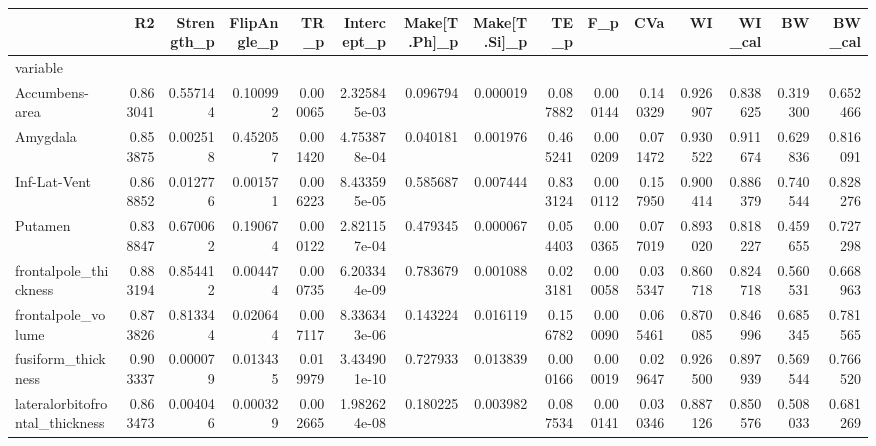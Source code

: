 \begin{tabular}{lrrrrrrrrrrrrrr}
\toprule
{} &        R2 &  Strength\_p &  FlipAngle\_p &      TR\_p &   Intercept\_p &  Make[T.Ph]\_p &  Make[T.Si]\_p &      TE\_p &       F\_p &       CVa &        WI &    WI\_cal &        BW &    BW\_cal \\
\midrule
variable                           &           &             &              &           &               &               &               &           &           &           &           &           &           &           \\
Accumbens-area                     &  0.863041 &    0.557144 &     0.100992 &  0.000065 &  2.325845e-03 &      0.096794 &      0.000019 &  0.087882 &  0.000144 &  0.140329 &  0.926907 &  0.838625 &  0.319300 &  0.652466 \\
Amygdala                           &  0.853875 &    0.002518 &     0.452057 &  0.001420 &  4.753878e-04 &      0.040181 &      0.001976 &  0.465241 &  0.000209 &  0.071472 &  0.930522 &  0.911674 &  0.629836 &  0.816091 \\
Inf-Lat-Vent                       &  0.868852 &    0.012776 &     0.001571 &  0.006223 &  8.433595e-05 &      0.585687 &      0.007444 &  0.833124 &  0.000112 &  0.157950 &  0.900414 &  0.886379 &  0.740544 &  0.828276 \\
Putamen                            &  0.838847 &    0.670062 &     0.190674 &  0.000122 &  2.821157e-04 &      0.479345 &      0.000067 &  0.054403 &  0.000365 &  0.077019 &  0.893020 &  0.818227 &  0.459655 &  0.727298 \\
frontalpole\_thickness              &  0.883194 &    0.854412 &     0.004474 &  0.000735 &  6.203344e-09 &      0.783679 &      0.001088 &  0.023181 &  0.000058 &  0.035347 &  0.860718 &  0.824718 &  0.560531 &  0.668963 \\
frontalpole\_volume                 &  0.873826 &    0.813344 &     0.020644 &  0.007117 &  8.336343e-06 &      0.143224 &      0.016119 &  0.156782 &  0.000090 &  0.065461 &  0.870085 &  0.846996 &  0.685345 &  0.781565 \\
fusiform\_thickness                 &  0.903337 &    0.000079 &     0.013435 &  0.019979 &  3.434901e-10 &      0.727933 &      0.013839 &  0.000166 &  0.000019 &  0.029647 &  0.926500 &  0.897939 &  0.569544 &  0.766520 \\
lateralorbitofrontal\_thickness     &  0.863473 &    0.004046 &     0.000329 &  0.002665 &  1.982624e-08 &      0.180225 &      0.003982 &  0.087534 &  0.000141 &  0.030346 &  0.887126 &  0.850576 &  0.508033 &  0.681269 \\

\end{tabular}
